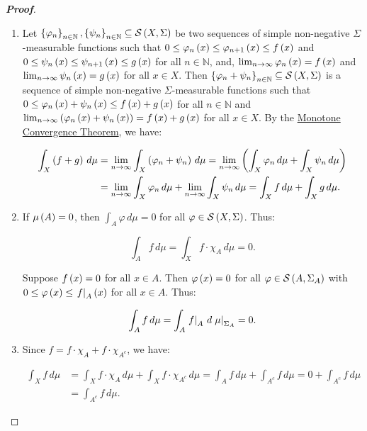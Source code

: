 \begin{proposition}
\begin{proof}[\rm\textbf{Proof}]
\begin{enumerate}
      \item Let $\left\{\varphi_n\right\}_{n\in\mathbb{N}},\left\{\psi_n\right\}_{n\in\mathbb{N}}\subseteq\mathcal{S}\left(X,\Sigma\right)$ be two sequences of simple non-negative $\Sigma$-measurable functions such that $0\leq\varphi_n\left(x\right)\leq\varphi_{n+1}\left(x\right)\leq f\left(x\right)$ and $0\leq\psi_n\left(x\right)\leq\psi_{n+1}\left(x\right)\leq g\left(x\right)$ for all $n\in\mathbb{N}$, and, $\lim_{n\to\infty}{\varphi_n\left(x\right)}=f\left(x\right)$ and $\lim_{n\to\infty}{\psi_n\left(x\right)}=g\left(x\right)$ for all $x\in X$. Then $\left\{\varphi_n+\psi_n\right\}_{n\in\mathbb{N}}\subseteq\mathcal{S}\left(X,\Sigma\right)$ is a sequence of simple non-negative $\Sigma$-measurable functions such that $0\leq\varphi_n\left(x\right)+\psi_n\left(x\right)\leq f\left(x\right)+g\left(x\right)$ for all $n\in\mathbb{N}$ and $\lim_{n\to\infty}{\left(\varphi_n\left(x\right)+\psi_n\left(x\right)\right)}=f\left(x\right)+g\left(x\right)$ for all $x\in X$. By the \hyperref[Monotone Convergence Theorem]{Monotone Convergence Theorem}, we have:
      
      \begin{equation}
        \begin{split}
          \int_{X}{\left(f+g\right)\,d\mu} & =\lim_{n\to\infty}{\int_{X}{\left(\varphi_n+\psi_n\right)\,d\mu}}=\lim_{n\to\infty}{\left(\int_{X}{\varphi_n\,d\mu}+\int_{X}{\psi_n\,d\mu}\right)}\\
          & =\lim_{n\to\infty}{\int_{X}{\varphi_n\,d\mu}}+\lim_{n\to\infty}{\int_{X}{\psi_n\,d\mu}}=\int_{X}{f\,d\mu}+\int_{X}{g\,d\mu}.
        \end{split}
      \end{equation}

      \item If $\mu\left(A\right)=0$, then $\int_{A}{\varphi\,d\mu}=0$ for all $\varphi\in\mathcal{S}\left(X,\Sigma\right)$. Thus:
      
      \begin{equation}
        \int_{A}{f\,d\mu}=\int_{X}{f\cdot\chi_A\,d\mu}=0.
      \end{equation}

      Suppose $f\left(x\right)=0$ for all $x\in A$. Then $\varphi\left(x\right)=0$ for all $\varphi\in\mathcal{S}\left(A,\Sigma_A\right)$ with $0\leq\varphi\left(x\right)\leq\left.f\right|_{A}\left(x\right)$ for all $x\in A$. Thus:
      
      \begin{equation}
        \int_{A}{f\,d\mu}=\int_{A}{\left.f\right|_{A}\,d\left.\mu\right|_{\Sigma_A}}=0.
      \end{equation}
      \item Since $f=f\cdot\chi_A+f\cdot\chi_{A^c}$, we have:
      
      \begin{equation}
        \begin{split}
          \int_{X}{f\,d\mu} & =\int_{X}{f\cdot\chi_A\,d\mu}+\int_{X}{f\cdot\chi_{A^c}\,d\mu}=\int_{A}{f\,d\mu}+\int_{A^c}{f\,d\mu}=0+\int_{A^c}{f\,d\mu}\\
          & =\int_{A^c}{f\,d\mu}.
        \end{split}
      \end{equation}


\end{enumerate}
\end{proof}
\end{proposition}
